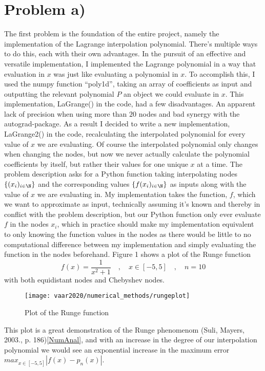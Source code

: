 \section{Problem a)}
The first problem is the foundation of the entire project, namely the implementation of the Lagrange interpolation polynomial. There's multiple ways to do this, each with their own advantages. In the pursuit of an effective and versatile implementation, I implemented the Lagrange polynomial in a way that evaluation in $x$ was just like evaluating a polynomial in $x$. To accomplish this, I used the numpy function ``poly1d'', taking an array of coefficients as input and outputting the relevant polynomial $P$ an object we could evaluate in $x$.
\newline This implementation, LaGrange() in the code, had a few disadvantages. An apparent lack of precision when using more than $20$ nodes and bad synergy with the autograd-package. As a result I decided to write a new implementation, LaGrange2() in the code, recalculating the interpolated polynomial for every value of $x$ we are evaluating. Of course the interpolated polynomial only changes when changing the nodes, but now we never actually calculate the polynomial coefficients by itself, but rather their values for one unique $x$ at a time.
\newline The problem description asks for a Python function taking interpolating nodes $\{(x_i)_{i\in\N}\}$ and the corresponding values $\{f(x_i)_{i\in\N}\}$ as inputs along with the value of $x$ we are evaluating in. My implementation takes the function, $f$, which we want to approximate as input, technically assuming it's known and thereby in conflict with the problem description, but our Python function only ever evaluate $f$ in the nodes $x_i$, which in practice should make my implementation equivalent to only knowing the function values in the nodes as there would be little to no computational difference between my implementation and simply evaluating the function in the nodes beforehand.
\newline Figure 1 shows a plot of the Runge function
  $$ f(x)=\frac{1}{x^2+1} \quad,\quad x\in[-5,5] \quad,\quad n=10$$
with both equidistant nodes and Chebyshev nodes.
\begin{figure}\label{Figure 1}
  \begin{center}
  \caption{Plot of the Runge function}\texttt{[image: vaar2020/numerical\_methods/rungeplot]}
\end{center}
\end{figure}
This plot is a great demonstration of the Runge phenomenom (Suli, Mayers, 2003., p. 186)\ref{NumAnal}, and with an increase in the degree of our interpolation polynomial we would see an exponential increase in the maximum error $max_{x\in[-5,5]}|f(x)-p_n(x)|$.

